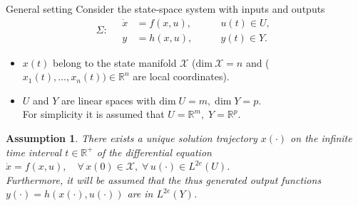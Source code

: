 \documentclass[aspectratio=169]{beamer}
\newcommand{\bbR}{\mathbb{R}}
\newtheorem{assumption}{Assumption}
\begin{document}
\begin{frame}{General setting}
Consider the state-space system with inputs and outputs
\begin{equation*}
	\Sigma : \quad 
	\begin{aligned}
		\dot{x} &= f(x, u), \\
		y &= h(x,u),
	\end{aligned} \qquad
	\begin{aligned}
		u(t) \in U, \\
		y(t) \in Y.
	\end{aligned}
\end{equation*} 

\begin{itemize}
	\item $x(t)$ belong to the state manifold $\mathcal{X}$ ($\mathrm{dim}\ \mathcal{X} = n$ and ($x_1(t), \dots, x_n(t)) \in \bbR^n$ are local coordinates).
	\item $U$ and $Y$ are linear spaces with $\mathrm{dim}\; U = m, \; \mathrm{dim}\; Y = p$.\\
	 For simplicity it is assumed that $U = \bbR^m, \; Y= \bbR^p$.
\end{itemize}
\begin{assumption}
	There exists a unique solution trajectory $x(\cdot)$ on the infinite time
	interval $t \in \bbR^+$ of the differential equation $\dot{x}=f(x,u), \quad \forall\, x(0) \in \mathcal{X}, \; \forall\, u(\cdot) \in L^{2e}(U)$.\\ Furthermore, it will be assumed that the thus generated output functions $y(\cdot) = h(x(\cdot), u(\cdot))$ are in $L^{2e}(Y)$.
\end{assumption}
\end{frame}
\end{document}
